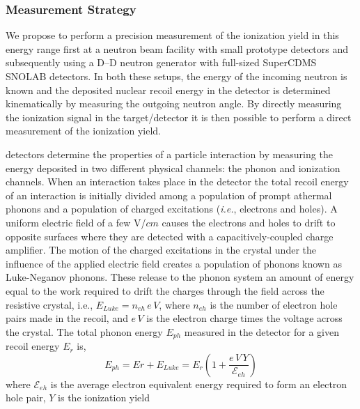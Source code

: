 \subsubsection{Measurement Strategy}

We propose to perform a precision measurement of the ionization yield in this energy range first at a neutron beam facility with small prototype detectors and subsequently using a D--D neutron generator with full-sized SuperCDMS SNOLAB detectors.  In both these setups, the energy of the incoming neutron is known and the deposited nuclear recoil energy in the detector is determined kinematically by measuring the outgoing neutron angle. By directly measuring the ionization signal in the target/detector it is then possible to perform a direct measurement of the ionization yield. 

\SuperCDMS detectors determine the properties of a particle interaction by measuring the energy deposited in two different physical channels: the phonon and ionization channels. When an interaction takes place in the detector the total recoil energy of an interaction is initially divided among a population of prompt athermal phonons and a population of charged excitations (\textit{i.e.}, electrons and holes). A uniform electric field of a few V/\(\!cm\) causes the electrons and holes to drift to opposite surfaces where they are detected with a capacitively-coupled charge amplifier. The motion of the charged excitations in the crystal under the influence of the applied electric field creates a population of phonons known as Luke-Neganov phonons. These release to the phonon system an amount of energy equal to the work required to drift the charges through the field across the resistive crystal, i.e., $E_{Luke} = n_{eh}\,e\,V$, where $n_{eh}$ is the number of electron hole pairs made in the recoil, and $e\,V$ is the electron charge times the voltage across the crystal.  The total phonon energy $E_{ph}$ measured in the detector for a given recoil energy $E_r$ is,
\begin{equation}
\label{eq:yield}
E_{ph} = Er + E_{Luke} = E_r \left ( 1+\frac{e\,V\,Y}{\mathcal{E}_{eh}} \right )
\end{equation}
where $\mathcal{E}_{eh}$ is the average electron equivalent energy required to form an electron hole pair, $Y$ is the ionization yield

